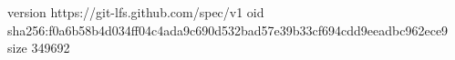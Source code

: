 version https://git-lfs.github.com/spec/v1
oid sha256:f0a6b58b4d034ff04c4ada9c690d532bad57e39b33cf694cdd9eeadbc962ece9
size 349692
